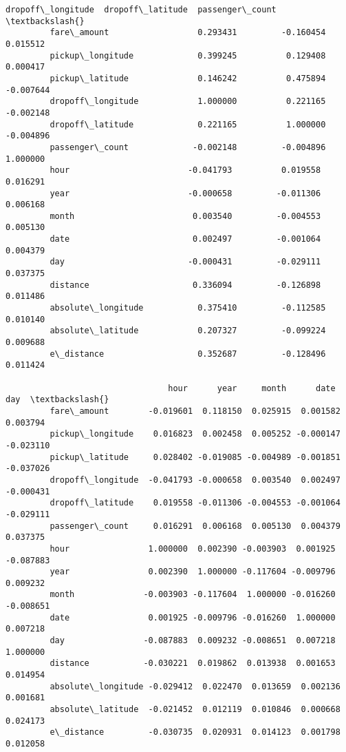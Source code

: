 \documentclass[11pt]{article}
\begin{document}
\begin{Verbatim}[commandchars=\\\{\}]
                             dropoff\_longitude  dropoff\_latitude  passenger\_count  \textbackslash{}
         fare\_amount                  0.293431         -0.160454         0.015512   
         pickup\_longitude             0.399245          0.129408         0.000417   
         pickup\_latitude              0.146242          0.475894        -0.007644   
         dropoff\_longitude            1.000000          0.221165        -0.002148   
         dropoff\_latitude             0.221165          1.000000        -0.004896   
         passenger\_count             -0.002148         -0.004896         1.000000   
         hour                        -0.041793          0.019558         0.016291   
         year                        -0.000658         -0.011306         0.006168   
         month                        0.003540         -0.004553         0.005130   
         date                         0.002497         -0.001064         0.004379   
         day                         -0.000431         -0.029111         0.037375   
         distance                     0.336094         -0.126898         0.011486   
         absolute\_longitude           0.375410         -0.112585         0.010140   
         absolute\_latitude            0.207327         -0.099224         0.009688   
         e\_distance                   0.352687         -0.128496         0.011424   
         
                                 hour      year     month      date       day  \textbackslash{}
         fare\_amount        -0.019601  0.118150  0.025915  0.001582  0.003794   
         pickup\_longitude    0.016823  0.002458  0.005252 -0.000147 -0.023110   
         pickup\_latitude     0.028402 -0.019085 -0.004989 -0.001851 -0.037026   
         dropoff\_longitude  -0.041793 -0.000658  0.003540  0.002497 -0.000431   
         dropoff\_latitude    0.019558 -0.011306 -0.004553 -0.001064 -0.029111   
         passenger\_count     0.016291  0.006168  0.005130  0.004379  0.037375   
         hour                1.000000  0.002390 -0.003903  0.001925 -0.087883   
         year                0.002390  1.000000 -0.117604 -0.009796  0.009232   
         month              -0.003903 -0.117604  1.000000 -0.016260 -0.008651   
         date                0.001925 -0.009796 -0.016260  1.000000  0.007218   
         day                -0.087883  0.009232 -0.008651  0.007218  1.000000   
         distance           -0.030221  0.019862  0.013938  0.001653  0.014954   
         absolute\_longitude -0.029412  0.022470  0.013659  0.002136  0.001681   
         absolute\_latitude  -0.021452  0.012119  0.010846  0.000668  0.024173   
         e\_distance         -0.030735  0.020931  0.014123  0.001798  0.012058   
         

\end{Verbatim}
\end{document}
